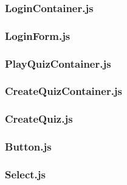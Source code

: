 \subsubsection{LoginContainer.js} %
\label{ssub:login_js}


\subsubsection{LoginForm.js} %
\label{ssub:loginform_js}


\subsubsection{PlayQuizContainer.js} %
\label{ssub:playquiz_js}


\subsubsection{CreateQuizContainer.js} %
\label{ssub:createquiz_js}


\subsubsection{CreateQuiz.js} %
\label{ssub:createquiz_js}


\subsubsection{Button.js} %
\label{ssub:yearselector_js}


\subsubsection{Select.js} %
\label{ssub:yearselector_js}


